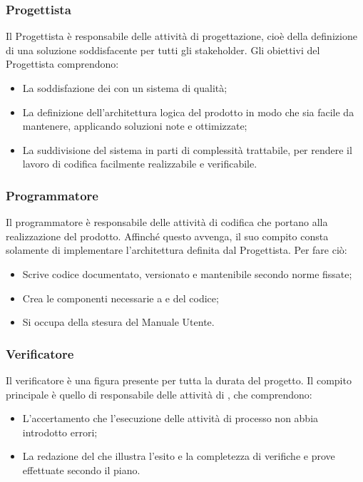 \documentclass[NormeDiProgetto.tex]{subfiles}
\begin{document}
	\subsubsection{Progettista}
	Il Progettista è responsabile delle attività di progettazione, cioè della definizione di una soluzione soddisfacente per tutti gli stakeholder. Gli obiettivi del Progettista comprendono:
	\begin{itemize}
		\item La soddisfazione dei  con un sistema di qualità;
		\item La definizione dell'architettura logica del prodotto in modo che sia facile da mantenere, applicando soluzioni note e ottimizzate;
		\item La suddivisione del sistema in parti di complessità trattabile, per rendere il lavoro di codifica facilmente realizzabile e verificabile.
	\end{itemize} 

	\subsubsection{Programmatore}
	Il programmatore è responsabile delle attività di codifica che portano alla realizzazione del prodotto. Affinché questo avvenga, il suo compito consta solamente di implementare l'architettura definita dal Progettista. Per fare ciò:
	\begin{itemize}
		\item Scrive codice documentato, versionato e mantenibile secondo norme fissate;
		\item Crea le componenti necessarie a  e  del codice;
		\item Si occupa della stesura del Manuale Utente.
	\end{itemize}

	\subsubsection{Verificatore}
	Il verificatore è una figura presente per tutta la durata del progetto. Il compito principale è quello di responsabile delle attività di , che comprendono:
	\begin{itemize}
	\item L'accertamento che l'esecuzione delle attività di processo non abbia introdotto errori;
	\item La redazione del \pdq che illustra l'esito e la completezza di verifiche e prove effettuate secondo il piano.
	\end{itemize}
	
\end{document}
